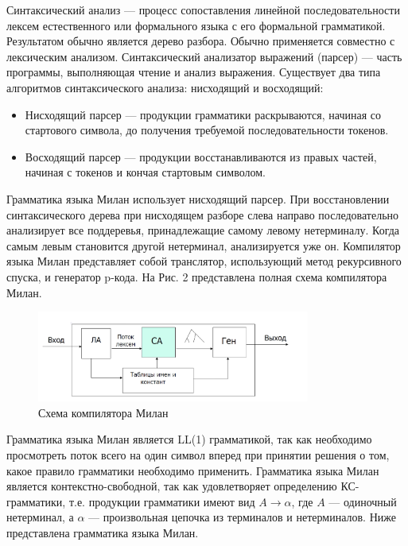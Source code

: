\documentclass[areasetadvanced]{scrartcl}
\begin{document}
    Синтаксический анализ — процесс сопоставления линейной последовательности лексем естественного или формального языка с его формальной грамматикой. Результатом обычно является дерево разбора. Обычно применяется совместно с лексическим анализом.
    Синтаксический анализатор выражений (парсер) — часть программы, выполняющая чтение и анализ выражения. 
    Существует два типа алгоритмов синтаксического анализа: нисходящий и восходящий:
    \begin{itemize}
        \item Нисходящий парсер — продукции грамматики раскрываются, начиная со стартового символа, до получения требуемой последовательности токенов. 
        \item Восходящий парсер — продукции восстанавливаются из правых частей, начиная с токенов и кончая стартовым символом. 
    \end{itemize}

    Грамматика языка Милан использует нисходящий парсер. При восстановлении синтаксического дерева при нисходящем разборе слева направо последовательно анализирует все поддеревья, принадлежащие самому левому нетерминалу. Когда самым левым становится другой нетерминал, анализируется уже он.
    Компилятор языка Милан представляет собой транслятор, использующий метод рекурсивного спуска, и генератор p-кода. На Рис. 2 представлена полная схема компилятора Милан. 

    \begin{figure}[H]
        \centering
        \includegraphics[width=0.8\textwidth]{compiler.png}
        \caption{Схема компилятора Милан}
    \end{figure}

    Грамматика языка Милан является LL(1) грамматикой, так как необходимо просмотреть поток всего на один символ вперед при принятии решения о том, какое правило грамматики необходимо применить. Грамматика языка Милан является контекстно-свободной, так как удовлетворяет определению КС-грамматики, т.е. продукции грамматики имеют вид $A \rightarrow \alpha$, где $A$ — одиночный нетерминал, а $\alpha$ — произвольная цепочка из терминалов и нетерминалов. Ниже представлена грамматика языка Милан. 
\end{document}
